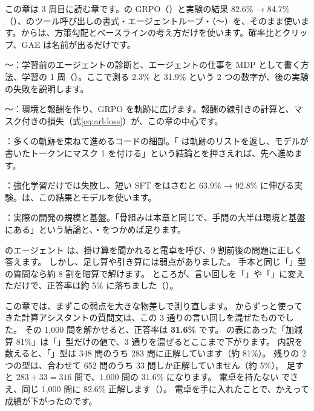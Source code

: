 \begin{readingguide}
\item[\rgpre] この章は 3 周目に読む章です。の GRPO（）と実験の結果 82.6\% → 84.7\%（）、のツール呼び出しの書式・エージェントループ・（〜）を、そのまま使います。からは、方策勾配とベースラインの考え方だけを使います。確率比とクリップ、GAE は名前が出るだけです。
\item[\rgmust] 〜：学習前のエージェントの診断と、エージェントの仕事を MDP として書く方法、学習の 1 周（）。ここで測る 2.3\% と 31.9\% という 2 つの数字が、後の実験の失敗を説明します。
\item[\rgmust] 〜：環境と報酬を作り、GRPO を軌跡に広げます。報酬の線引きの計算と、マスク付きの損失（式\eqref{eq:arl-loss}）が、この章の中心です。
\item[\rgskim] ：多くの軌跡を束ねて進めるコードの細部。「 は軌跡のリストを返し、モデルが書いたトークンにマスク 1 を付ける」という結論とを押さえれば、先へ進めます。
\item[\rgmust] ：強化学習だけでは失敗し、短い SFT をはさむと 63.9\% → 92.8\% に伸びる実験。は、この結果とモデルを使います。
\item[\rgskim] ：実際の開発の規模と基盤。「骨組みは本章と同じで、手間の大半は環境と基盤にある」という結論と、・をつかめば足ります。
\end{readingguide}

のエージェント  は、掛け算を聞かれると電卓を呼び、9 割前後の問題に正しく答えます。
しかし、足し算や引き算には弱点がありました。
手本と同じ「」型の質問なら約 8 割を暗算で解けます。
ところが、言い回しを「」や「」に変えただけで、正答率は約 5\% に落ちました（）。

この章では、まずこの弱点を大きな物差しで測り直します。
からずっと使ってきた計算アシスタントの質問文は、この 3 通りの言い回しを混ぜたものでした。
その 1,000 問を解かせると、正答率は \textbf{31.6\%} です。
の表にあった「加減算 81\%」は「」型だけの値で、3 通りを混ぜるとここまで下がります。
内訳を数えると、「」型は 348 問のうち 283 問に正解しています（約 81\%）。
残りの 2 つの型は、合わせて 652 問のうち 33 問しか正解していません（約 5\%）。
足すと $283+33=316$ 問で、1,000 問の 31.6\% になります。
電卓を持たない  でさえ、同じ 1,000 問に 82.6\% 正解します（）。
電卓を手に入れたことで、かえって成績が下がったのです。

